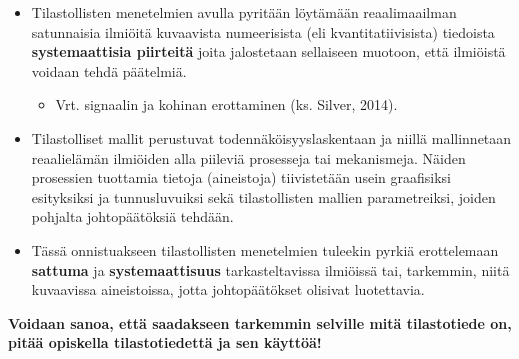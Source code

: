 \documentclass[
]{book}
\providecommand{\tightlist}{%
  \setlength{\itemsep}{0pt}\setlength{\parskip}{0pt}}
\begin{document}
\begin{itemize}
  \begin{itemize}
  \tightlist
  \item
    Tilastollisten menetelmien avulla pyritään löytämään reaalimaailman satunnaisia ilmiöitä kuvaavista numeerisista (eli kvantitatiivisista) tiedoista \textbf{systemaattisia piirteitä} joita jalostetaan sellaiseen muotoon, että ilmiöistä voidaan tehdä päätelmiä.

    \begin{itemize}
    \tightlist
    \item
      Vrt. signaalin ja kohinan erottaminen (ks. Silver, 2014).
    \end{itemize}
  \item
    Tilastolliset mallit perustuvat todennäköisyyslaskentaan ja niillä mallinnetaan reaalielämän ilmiöiden alla piileviä prosesseja tai mekanismeja. Näiden prosessien tuottamia tietoja (aineistoja) tiivistetään usein graafisiksi esityksiksi ja tunnusluvuiksi sekä tilastollisten mallien parametreiksi, joiden pohjalta johtopäätöksiä tehdään.
  \item
    Tässä onnistuakseen tilastollisten menetelmien tuleekin pyrkiä erottelemaan \textbf{sattuma} ja \textbf{systemaattisuus} tarkasteltavissa ilmiöissä tai, tarkemmin, niitä kuvaavissa aineistoissa, jotta johtopäätökset olisivat luotettavia.
  \end{itemize}
\end{itemize}

\textbf{Voidaan sanoa, että saadakseen tarkemmin selville mitä tilastotiede on, pitää opiskella tilastotiedettä ja sen käyttöä!}
\end{document}
